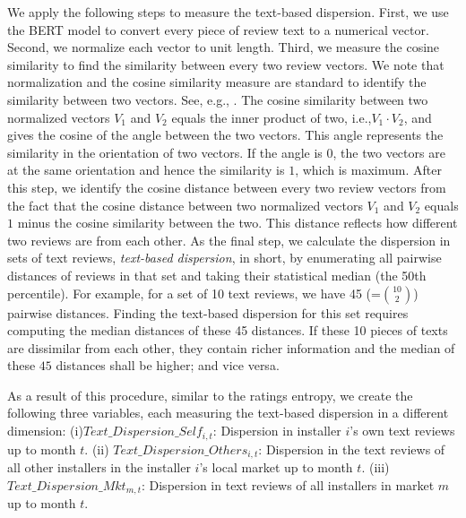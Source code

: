 \documentclass[msom,blindrev]{informs3}
\begin{document}
We apply the following steps to measure the text-based dispersion. First, we use the BERT model to convert every piece of review text to a numerical vector. Second, we normalize each vector to unit length. Third, we measure the cosine similarity to find the similarity between every two review vectors. We note that normalization and the cosine similarity measure are standard to identify the similarity between two vectors. See, e.g., \cite{hoberg2016text}. The cosine similarity between two normalized vectors $V_{1}$ and $V_{2}$ equals the inner product of two, i.e.,$V_1 \cdot V_2$, and gives the cosine of the angle between the two vectors. This angle represents the similarity in the orientation of two vectors. If the angle is $0$, the two vectors are at the same orientation and hence the similarity is $1$, which is maximum. After this step, we identify the cosine distance between every two review vectors from the fact that the cosine distance between two normalized vectors $V_{1}$ and $V_{2}$ equals $1$ minus the cosine similarity between the two. This distance reflects how different two reviews are from each other. As the final step, we calculate the dispersion in sets of text reviews, \emph{text-based dispersion}, in short, by enumerating all pairwise distances of reviews in that set and taking their statistical median (the 50th percentile). For example, for a set of 10 text reviews, we have 45 (=$\binom{10}{2}$) pairwise distances. Finding the text-based dispersion for this set requires computing the median distances of these 45 distances. If these 10 pieces of texts are dissimilar from each other, they contain richer information and the median of these $45$ distances shall be higher; and vice versa.

As a result of this procedure, similar to the ratings entropy, we create the following three variables, each measuring the text-based dispersion in a different dimension: (i)$Text\_Dispersion\_Self_{i,t}$: Dispersion in installer $i$'s own text reviews up to month $t$. %
(ii) $Text\_Dispersion\_Others_{i,t}$: Dispersion in the text reviews of all other installers in the installer $i$'s local market up to month $t$. %
(iii)$Text\_Dispersion\_Mkt_{m,t}$: Dispersion in text reviews of all installers in market $m$ up to month $t$. %
\end{document}

